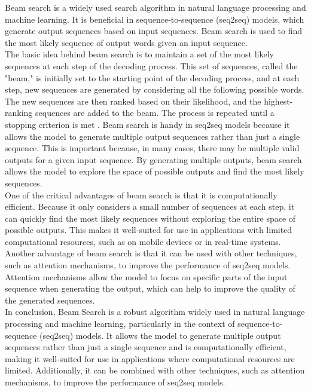 Beam search is a widely used search algorithm in natural language processing and machine learning. It is beneficial in sequence-to-sequence (seq2seq) models, which generate output sequences based on input sequences. Beam search is used to find the most likely sequence of output words given an input sequence.
\\
The basic idea behind beam search is to maintain a set of the most likely sequences at each step of the decoding process. This set of sequences, called the "beam," is initially set to the starting point of the decoding process, and at each step, new sequences are generated by considering all the following possible words. The new sequences are then ranked based on their likelihood, and the highest-ranking sequences are added to the beam. The process is repeated until a stopping criterion is met \cite{10.1371/journal.pone.0211558}.
Beam search is handy in seq2seq models because it allows the model to generate multiple output sequences rather than just a single sequence. This is important because, in many cases, there may be multiple valid outputs for a given input sequence. By generating multiple outputs, beam search allows the model to explore the space of possible outputs and find the most likely sequences.
\\
One of the critical advantages of beam search is that it is computationally efficient. Because it only considers a small number of sequences at each step, it can quickly find the most likely sequences without exploring the entire space of possible outputs. This makes it well-suited for use in applications with limited computational resources, such as on mobile devices or in real-time systems.
Another advantage of beam search is that it can be used with other techniques, such as attention mechanisms, to improve the performance of seq2seq models. Attention mechanisms allow the model to focus on specific parts of the input sequence when generating the output, which can help to improve the quality of the generated sequences.
\\
In conclusion, Beam Search is a robust algorithm widely used in natural language processing and machine learning, particularly in the context of sequence-to-sequence (seq2seq) models. It allows the model to generate multiple output sequences rather than just a single sequence and is computationally efficient, making it well-suited for use in applications where computational resources are limited. Additionally, it can be combined with other techniques, such as attention mechanisms, to improve the performance of seq2seq models.

